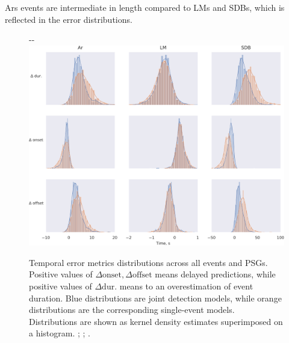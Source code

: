 \acp{Ar} events are intermediate in length compared to \acp{LM} and \acp{SDB}, which is reflected in the error distributions.
\begin{figure}[tb]
    \centering
    \begin{adjustwidth*}{}{-\marginparwidth-\marginparsep}
    \includegraphics[width=\linewidth]{figures/paper-vi/distribution_plots.pdf}
    \caption[Distribution of temporal error metrics]{Temporal error metrics distributions across all events and \acp{PSG}. Positive values of \(\Delta\text{onset}, \Delta\text{offset}\) means delayed predictions, while positive values of \(\Delta\text{dur.}\) means to an overestimation of event duration. Blue distributions are joint detection models, while orange distributions are the corresponding single-event models. Distributions are shown as kernel density estimates superimposed on a histogram. %
    ; %
    ; %
    .}
    \label{fig:event-detection:paper-vi:temporal-morphology}
    \end{adjustwidth*}
\end{figure}


